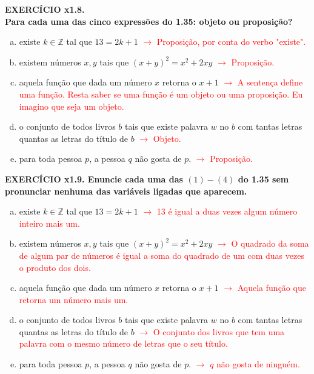 \documentclass[a4paper, 12pt]{article}
\begin{document}
\noindent \textbf{EXERCÍCIO x1.8. \\
Para cada uma das cinco expressões do 1.35: objeto ou proposição?}
\begin{enumerate}[(a)]
    \item existe $k \in \mathbb{Z}$ tal que $13 = 2k + 1$ \textcolor{red}{$\rightarrow$ Proposição, por conta do verbo "existe".}
    \item existem números $x,y$ tais que $(x+y)^{2} = x^{2}+2xy$ \textcolor{red}{$\rightarrow$ Proposição.}
    \item aquela função que dada um número $x$ retorna o $x+1$ \textcolor{red}{$\rightarrow$ A sentença define uma função. Resta saber se uma função é um objeto ou uma proposição. Eu imagino que seja um objeto.}
    \item o conjunto de todos livros $b$ tais que existe palavra $w$ no $b$ com tantas letras quantas as letras do título de $b$ \textcolor{red}{$\rightarrow$ Objeto.}
    \item para toda pessoa $p$, a pessoa $q$ não gosta de $p$. \textcolor{red}{$\rightarrow$ Proposição.} \\
\end{enumerate}

\noindent \textbf{EXERCÍCIO x1.9.
Enuncie cada uma das $(1)-(4)$ do 1.35 sem pronunciar nenhuma das variáveis ligadas
que aparecem. }
\begin{enumerate}[(a)]
    \item existe $k \in \mathbb{Z}$ tal que $13 = 2k + 1$ \textcolor{red}{$\rightarrow$ 13 é igual a duas vezes algum número inteiro mais um.}
    \item existem números $x,y$ tais que $(x+y)^{2} = x^{2}+2xy$ \textcolor{red}{$\rightarrow$ O quadrado da soma de algum par de números é igual a soma do quadrado de um com duas vezes o produto dos dois.}
    \item aquela função que dada um número $x$ retorna o $x+1$ \textcolor{red}{$\rightarrow$ Aquela função que retorna um número mais um.}
    \item o conjunto de todos livros $b$ tais que existe palavra $w$ no $b$ com tantas letras quantas as letras do título de $b$ \textcolor{red}{$\rightarrow$ O conjunto dos livros que tem uma palavra com o mesmo número de letras que o seu título.}
    \item para toda pessoa $p$, a pessoa $q$ não gosta de $p$. \textcolor{red}{$\rightarrow$ $q$ não gosta de ninguém.} \\
\end{enumerate}
\end{document}
